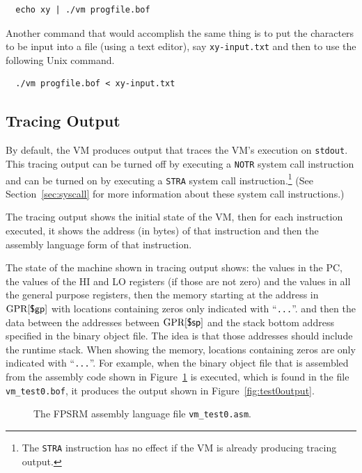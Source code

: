 \documentclass[11pt,letterpaper]{article}
\newcommand{\LSTFILE}[1]{

}
\newcommand{\figref}[1]{Figure~\ref{#1}}  %
\newcommand{\secref}[1]{Section~\ref{#1}}  %
\begin{document}
\begin{lstlisting}
  echo xy | ./vm progfile.bof
\end{lstlisting}

Another command that would accomplish the same thing is to put the
characters to be input into a file (using a text editor), say
\texttt{xy-input.txt} and then to use the following Unix command.

\begin{lstlisting}
  ./vm progfile.bof < xy-input.txt
\end{lstlisting}

\subsection{Tracing Output}

By default, the VM produces output that traces the VM's execution on
\texttt{stdout}.
This tracing output can be
turned off by executing a \texttt{NOTR} system call instruction
and can be turned on by executing a \texttt{STRA} system call
instruction.\footnote{The \texttt{STRA} instruction has no effect if
the VM is already producing tracing output.}
(See \secref{sec:syscall} for more information about these system call
instructions.)

The tracing output shows the initial state of the VM, then for each
instruction executed, it shows the address (in bytes) of that
instruction and then the assembly language form of that instruction.

The state of the machine shown in tracing output shows:
the values in the PC, the values of the HI and LO registers (if those
are not zero) and the values in all the general purpose registers,
then the memory starting at the address in $\textrm{GPR[}\textsf{\$gp}\textrm{]}$
with locations containing zeros only indicated with ``\texttt{...}''.
and then the data between the addresses between $\textrm{GPR[}\textsf{\$sp}\textrm{]}$ and
the stack bottom address specified in the binary object file.
The idea is that those addresses should include the runtime stack.
When showing the memory, locations containing zeros are only
indicated with ``\texttt{...}''.
For example, when the binary object file that is assembled from the
assembly code shown in \figref{fig:test0asm} is executed,
which is found in the file \texttt{vm\_test0.bof},
it produces the output shown in \figref{fig:test0output}.

\begin{figure}
\LSTFILE{vm_test0.asm}
\caption{The FPSRM assembly language file \texttt{vm\_test0.asm}.} 
\label{fig:test0asm}
\end{figure}
\end{document}
